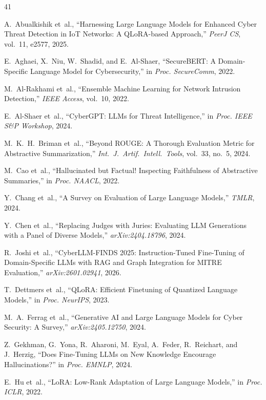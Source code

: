 \documentclass[journal]{IEEEtran}
\begin{document}
\begin{thebibliography}{41}

A.~Abualkishik et~al., ``Harnessing Large Language Models for Enhanced Cyber Threat Detection in IoT Networks: A QLoRA-based Approach,'' \emph{PeerJ CS}, vol.~11, e2577, 2025.

E.~Aghaei, X.~Niu, W.~Shadid, and E.~Al-Shaer, ``SecureBERT: A Domain-Specific Language Model for Cybersecurity,'' in \emph{Proc. SecureComm}, 2022.

M.~Al-Rakhami et~al., ``Ensemble Machine Learning for Network Intrusion Detection,'' \emph{IEEE Access}, vol.~10, 2022.

E.~Al-Shaer et~al., ``CyberGPT: LLMs for Threat Intelligence,'' in \emph{Proc. IEEE S\&P Workshop}, 2024.

M.~K.~H.~Briman et~al., ``Beyond ROUGE: A Thorough Evaluation Metric for Abstractive Summarization,'' \emph{Int.\ J.\ Artif.\ Intell.\ Tools}, vol.~33, no.~5, 2024.

M.~Cao et~al., ``Hallucinated but Factual! Inspecting Faithfulness of Abstractive Summaries,'' in \emph{Proc. NAACL}, 2022.

Y.~Chang et~al., ``A Survey on Evaluation of Large Language Models,'' \emph{TMLR}, 2024.

Y.~Chen et~al., ``Replacing Judges with Juries: Evaluating LLM Generations with a Panel of Diverse Models,'' \emph{arXiv:2404.18796}, 2024.

R.~Joshi et~al., ``CyberLLM-FINDS 2025: Instruction-Tuned Fine-Tuning of Domain-Specific LLMs with RAG and Graph Integration for MITRE Evaluation,'' \emph{arXiv:2601.02941}, 2026.

T.~Dettmers et~al., ``QLoRA: Efficient Finetuning of Quantized Language Models,'' in \emph{Proc. NeurIPS}, 2023.

M.~A.~Ferrag et~al., ``Generative AI and Large Language Models for Cyber Security: A Survey,'' \emph{arXiv:2405.12750}, 2024.

Z.~Gekhman, G.~Yona, R.~Aharoni, M.~Eyal, A.~Feder, R.~Reichart, and J.~Herzig, ``Does Fine-Tuning LLMs on New Knowledge Encourage Hallucinations?'' in \emph{Proc. EMNLP}, 2024.

E.~Hu et~al., ``LoRA: Low-Rank Adaptation of Large Language Models,'' in \emph{Proc. ICLR}, 2022.


\end{thebibliography}
\end{document}
